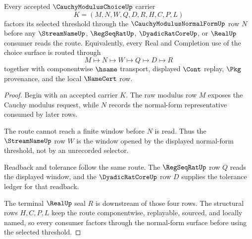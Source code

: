 \begin{theorem}
\label{thm:cauchy-modulus-choice-normal-form-factorization}
Every accepted $\CauchyModulusChoiceUp$ carrier
$$
K=(M,N,W,Q,D,R,H,C,P,L)
$$
factors its selected threshold through the $\CauchyModulusNormalFormUp$ row $N$ before any $\StreamNameUp$, $\RegSeqRatUp$, $\DyadicRatCoreUp$, or $\RealUp$ consumer reads the route. Equivalently, every Real and Completion use of the choice surface is routed through
$$
M\longmapsto N\longmapsto W\longmapsto Q\longmapsto D\longmapsto R
$$
together with componentwise $\hsame$ transport, displayed $\Cont$ replay, $\Pkg$ provenance, and the local $\NameCert$ row.
\end{theorem}
\begin{proof}
Begin with an accepted carrier $K$. The raw modulus row $M$ exposes the Cauchy modulus request, while $N$ records the normal-form representative consumed by later rows.

The route cannot reach a finite window before $N$ is read. Thus the $\StreamNameUp$ row $W$ is the window opened by the displayed normal-form threshold, not by an unrecorded selector.

Readback and tolerance follow the same route. The $\RegSeqRatUp$ row $Q$ reads the displayed window, and the $\DyadicRatCoreUp$ row $D$ supplies the tolerance ledger for that readback.

The terminal $\RealUp$ seal $R$ is downstream of those four rows. The structural rows $H,C,P,L$ keep the route componentwise, replayable, sourced, and locally named, so every consumer factors through the normal-form surface before using the selected threshold.
\end{proof}

